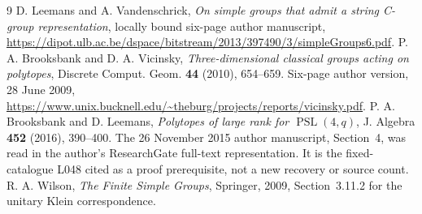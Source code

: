 \documentclass[11pt,a4paper]{article}
\begin{document}
\begin{thebibliography}{9}
 D. Leemans and A. Vandenschrick, \emph{On simple groups that admit
a string C-group representation}, locally bound six-page author manuscript,
\url{https://dipot.ulb.ac.be/dspace/bitstream/2013/397490/3/simpleGroups6.pdf}.
 P. A. Brooksbank and D. A. Vicinsky, \emph{Three-dimensional
classical groups acting on polytopes}, Discrete Comput. Geom. \textbf{44}
(2010), 654--659. Six-page author version, 28 June 2009,
\url{https://www.unix.bucknell.edu/~theburg/projects/reports/vicinsky.pdf}.
 P. A. Brooksbank and D. Leemans, \emph{Polytopes of large rank
for $\operatorname{PSL}(4,q)$}, J. Algebra \textbf{452} (2016), 390--400.
The 26 November 2015 author manuscript, Section~4, was read in the author's
ResearchGate full-text representation. It is the fixed-catalogue L048 cited
as a proof prerequisite, not a new recovery or source count.
 R. A. Wilson, \emph{The Finite Simple Groups}, Springer, 2009,
Section~3.11.2 for the unitary Klein correspondence.
\end{thebibliography}
\end{document}
